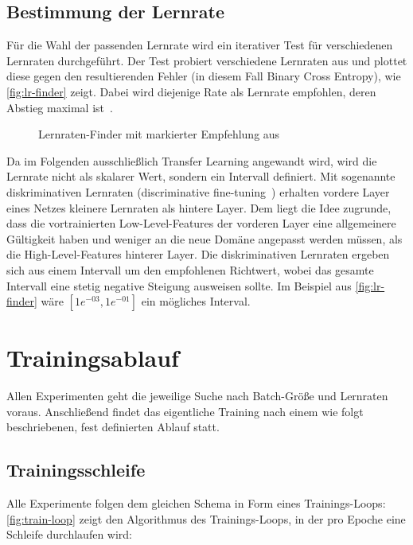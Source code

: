 \subsection{Bestimmung der Lernrate}
\label{subsec:vorkehrungen}

Für die Wahl der passenden Lernrate wird ein iterativer Test für verschiedenen Lernraten durchgeführt.
Der Test probiert verschiedene Lernraten aus und plottet diese gegen den resultierenden Fehler (in diesem Fall Binary Cross Entropy), wie \autoref{fig:lr-finder} zeigt.
Dabei wird diejenige Rate als Lernrate empfohlen, deren Abstieg maximal ist~\cite{Smith15}.

\begin{figure}
    \centering
    \caption{Lernraten-Finder mit markierter Empfehlung aus~\cite{Gugger20}}
    \label{fig:lr-finder}
\end{figure}

Da im Folgenden ausschließlich Transfer Learning angewandt wird, wird die Lernrate nicht als skalarer Wert, sondern ein Intervall definiert.
Mit sogenannte diskriminativen Lernraten (discriminative fine-tuning~\cite{Howard18}) erhalten vordere Layer eines Netzes kleinere Lernraten als hintere Layer.
Dem liegt die Idee zugrunde, dass die vortrainierten Low-Level-Features der vorderen Layer eine allgemeinere Gültigkeit haben und weniger an die neue Domäne angepasst werden müssen, als die High-Level-Features hinterer Layer.
Die diskriminativen Lernraten ergeben sich aus einem Intervall um den empfohlenen Richtwert, wobei das gesamte Intervall eine stetig negative Steigung ausweisen sollte.
Im Beispiel aus \autoref{fig:lr-finder} wäre $[1e^{-03}, 1e^{-01}]$ ein mögliches Interval.

\section{Trainingsablauf}
\label{sec:trainingsablauf}

Allen Experimenten geht die jeweilige Suche nach Batch-Größe und Lernraten voraus.
Anschließend findet das eigentliche Training nach einem wie folgt beschriebenen, fest definierten Ablauf statt.

\subsection{Trainingsschleife}
\label{subsec:trainingsschleife}

Alle Experimente folgen dem gleichen Schema in Form eines Trainings-Loops:
\autoref{fig:train-loop} zeigt den Algorithmus des Trainings-Loops, in der pro Epoche eine Schleife durchlaufen wird:

